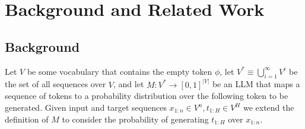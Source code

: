\section{Background and Related Work}
\label{section:bground_related}





\subsection{Background}
\label{subsec:background}


Let $V$ be some vocabulary that contains the empty token $\phi$, let $V^*\equiv \bigcup_{i=1}^{\infty}V^i$ be the set of all sequences over $V$, and let $M:V^*\to[0,1]^{|V|}$ be an LLM that maps a sequence of tokens to a probability distribution over the following token to be generated. Given input and target sequences $x_{1:n}\in V^n, t_{1:H}\in V^{H}$ we extend the definition of $M$ to consider the probability of generating $t_{1:H}$ over $x_{1:n}$. 

